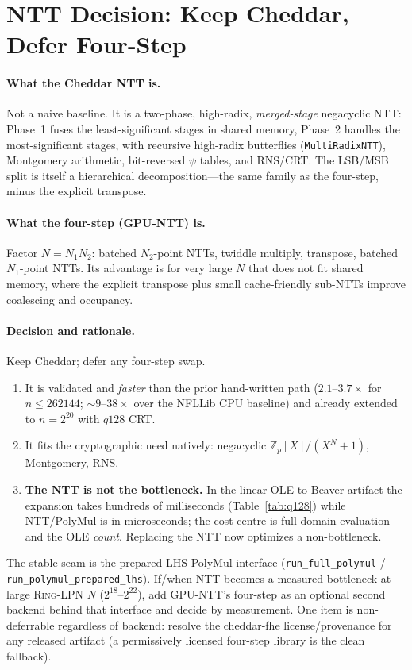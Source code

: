 \documentclass[11pt]{article}
\newcommand{\Z}{\mathbb{Z}}
\newcommand{\RingLPN}{\textsc{Ring-LPN}}
\newcommand{\SPFSS}{\mathsf{SPFSS}}
\begin{document}
\section{NTT Decision: Keep Cheddar, Defer Four-Step}
\label{sec:ntt}

\paragraph{What the Cheddar NTT is.} Not a naive baseline. It is a two-phase,
high-radix, \emph{merged-stage} negacyclic NTT: Phase~1 fuses the least-significant
stages in shared memory, Phase~2 handles the most-significant stages, with
recursive high-radix butterflies (\texttt{MultiRadixNTT}), Montgomery arithmetic,
bit-reversed $\psi$ tables, and RNS/CRT. The LSB/MSB split is itself a
hierarchical decomposition---the same family as the four-step, minus the explicit
transpose.

\paragraph{What the four-step (GPU-NTT) is.} Factor $N=N_1N_2$: batched
$N_2$-point NTTs, twiddle multiply, transpose, batched $N_1$-point NTTs. Its
advantage is for very large $N$ that does not fit shared memory, where the
explicit transpose plus small cache-friendly sub-NTTs improve coalescing and
occupancy.

\paragraph{Decision and rationale.} Keep Cheddar; defer any four-step swap.
\begin{enumerate}[leftmargin=*]
  \item It is validated and \emph{faster} than the prior hand-written path
  ($2.1$--$3.7\times$ for $n\le 262144$; $\sim 9$--$38\times$ over the NFLLib CPU
  baseline) and already extended to $n=2^{20}$ with $q128$ CRT.
  \item It fits the cryptographic need natively: negacyclic $\Z_p[X]/(X^N+1)$,
  Montgomery, RNS.
  \item \textbf{The NTT is not the bottleneck.} In the linear OLE-to-Beaver
  artifact the expansion takes hundreds of milliseconds
  (Table~\ref{tab:q128}) while NTT/PolyMul is in microseconds; the cost centre is
  \SPFSS{} full-domain evaluation and the OLE \emph{count}. Replacing the NTT now
  optimizes a non-bottleneck.
\end{enumerate}
The stable seam is the prepared-LHS PolyMul interface
(\texttt{run\_full\_polymul} / \texttt{run\_polymul\_prepared\_lhs}). If/when NTT
becomes a measured bottleneck at large \RingLPN{} $N$ ($2^{18}$--$2^{22}$), add
GPU-NTT's four-step as an optional second backend behind that interface and
decide by measurement. One item is non-deferrable regardless of backend: resolve
the cheddar-fhe license/provenance for any released artifact (a permissively
licensed four-step library is the clean fallback).
\end{document}
